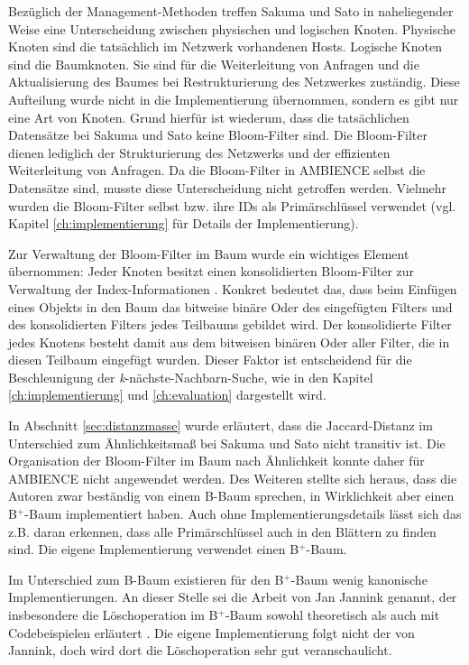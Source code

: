 Bezüglich der Management-Methoden treffen Sakuma und Sato in naheliegender Weise eine Unterscheidung zwischen physischen und logischen Knoten. Physische Knoten sind die tatsächlich im Netzwerk vorhandenen Hosts. Logische Knoten sind die Baumknoten. Sie sind für die Weiterleitung von Anfragen und die Aktualisierung des Baumes bei Restrukturierung des Netzwerkes zuständig. Diese Aufteilung wurde nicht in die Implementierung übernommen, sondern es gibt nur eine Art von Knoten. Grund hierfür ist wiederum, dass die tatsächlichen Datensätze bei Sakuma und Sato keine Bloom-Filter sind. Die Bloom-Filter dienen lediglich der Strukturierung des Netzwerks und der effizienten Weiterleitung von Anfragen. Da die Bloom-Filter in AMBIENCE selbst die Datensätze sind, musste diese Unterscheidung nicht getroffen werden. Vielmehr wurden die Bloom-Filter selbst bzw. ihre IDs als Primärschlüssel verwendet (vgl. Kapitel \ref{ch:implementierung} für Details der Implementierung). 

Zur Verwaltung der Bloom-Filter im Baum wurde ein wichtiges Element übernommen: Jeder Knoten besitzt einen konsolidierten Bloom-Filter zur Verwaltung der Index-Informationen \cite{Sakuma2011}. Konkret bedeutet das, dass beim Einfügen eines Objekts in den Baum das bitweise binäre Oder des eingefügten Filters und des konsolidierten Filters jedes Teilbaums gebildet wird. Der konsolidierte Filter jedes Knotens besteht damit aus dem bitweisen binären Oder aller Filter, die in diesen Teilbaum eingefügt wurden. Dieser Faktor ist entscheidend für die Beschleunigung der \textit{k}-nächste-Nachbarn-Suche, wie in den Kapitel \ref{ch:implementierung} und \ref{ch:evaluation} dargestellt wird. 

In Abschnitt \ref{sec:distanzmasse} wurde erläutert, dass die Jaccard-Distanz im Unterschied zum Ähnlichkeitsmaß bei Sakuma und Sato nicht transitiv ist. Die Organisation der Bloom-Filter im Baum nach Ähnlichkeit konnte daher für AMBIENCE nicht angewendet werden. Des Weiteren stellte sich heraus, dass die Autoren zwar beständig von einem B-Baum sprechen, in Wirklichkeit aber einen B$^+$-Baum implementiert haben. Auch ohne Implementierungsdetails lässt sich das z.B. daran erkennen, dass alle Primärschlüssel auch in den Blättern zu finden sind. Die eigene Implementierung verwendet einen B$^+$-Baum. 

Im Unterschied zum B-Baum existieren für den B$^+$-Baum wenig kanonische Implementierungen. An dieser Stelle sei die Arbeit von Jan Jannink genannt, der insbesondere die Löschoperation im B$^+$-Baum sowohl theoretisch als auch mit Codebeispielen erläutert \cite{Jannink1995}. Die eigene Implementierung folgt nicht der von Jannink, doch wird dort die Löschoperation sehr gut veranschaulicht. 
